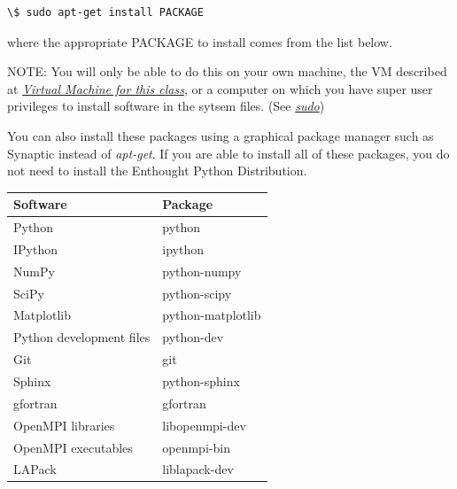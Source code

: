 \documentclass[letterpaper,10pt,english]{sphinxmanual}
\begin{document}
\begin{Verbatim}[commandchars=\\\{\}]
\$ sudo apt-get install PACKAGE
\end{Verbatim}

where the appropriate PACKAGE to install comes from the list below.

NOTE: You will only be able to do this on your own machine, the VM described
at {\hyperref[vm:vm]{\emph{Virtual Machine for this class}}}, or a computer on which you have super user privileges to
install software in the sytsem files.  (See {\hyperref[unix:sudo]{\emph{sudo}}})

You can also install
these packages using a graphical package manager such as Synaptic
instead of \emph{apt-get}.  If you are able to install all of these
packages, you do not need to install the Enthought Python
Distribution.

\begin{tabulary}{\linewidth}{|L|L|}
\hline
\textbf{
Software
} & \textbf{
Package
}\\\hline

Python
 & 
python
\\\hline

IPython
 & 
ipython
\\\hline

NumPy
 & 
python-numpy
\\\hline

SciPy
 & 
python-scipy
\\\hline

Matplotlib
 & 
python-matplotlib
\\\hline

Python development files
 & 
python-dev
\\\hline

Git
 & 
git
\\\hline

Sphinx
 & 
python-sphinx
\\\hline

gfortran
 & 
gfortran
\\\hline

OpenMPI libraries
 & 
libopenmpi-dev
\\\hline

OpenMPI executables
 & 
openmpi-bin
\\\hline

LAPack
 & 
liblapack-dev
\\\hline
\end{tabulary}
\end{document}
